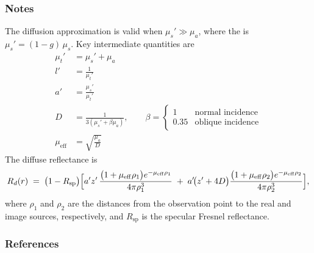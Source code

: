\documentclass[letterpaper,10pt,english]{sphinxmanual}
\begin{document}
\begin{fulllineitems}
\subsubsection{Notes}
\label{\detokenize{generated/photon_canon.contrib.diffusion_theory:id1}}
\sphinxAtStartPar
The diffusion approximation is valid when
\(\mu_s' \gg \mu_a\), where the  is \(\mu_s' = (1-g)\,\mu_s\).
Key intermediate quantities are
\begin{equation*}
\begin{split}\mu_t' &= \mu_s' + \mu_a \\
l'     &= \frac{1}{\mu_t'} \\
a'     &= \frac{\mu_s'}{\mu_t'} \\[6pt]
D      &= \frac{1}{3\left(\mu_s' + \beta\mu_a\right)}, \qquad
         \beta = \begin{cases}
           1 & \text{normal incidence} \\
           0.35 & \text{oblique incidence}
         \end{cases} \\[6pt]
\mu_{\mathrm{eff}} &= \sqrt{\frac{\mu_a}{D}}\end{split}
\end{equation*}
\sphinxAtStartPar
The diffuse reflectance is
\begin{equation*}
\begin{split}R_d(r) \;=\; \bigl(1-R_{\mathrm{sp}}\bigr)
\Bigl[
    a' z' \,
    \frac{\bigl(1+\mu_{\mathrm{eff}}\rho_1\bigr)
          e^{-\mu_{\mathrm{eff}}\rho_1}}{4\pi\rho_1^{3}}
    \;+\;
    a'\!\bigl(z' + 4D\bigr)
    \frac{\bigl(1+\mu_{\mathrm{eff}}\rho_2\bigr)
          e^{-\mu_{\mathrm{eff}}\rho_2}}{4\pi\rho_2^{3}}
\Bigr],\end{split}
\end{equation*}
\sphinxAtStartPar
where \(\rho_1\) and \(\rho_2\) are the distances from the
observation point to the real and image sources, respectively, and
\(R_{\mathrm{sp}}\) is the specular Fresnel reflectance.


\subsubsection{References}
\label{\detokenize{generated/photon_canon.contrib.diffusion_theory:references}}
\end{fulllineitems}

\end{document}
